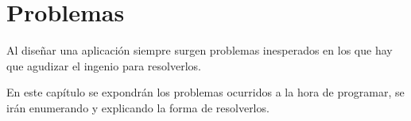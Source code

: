 %
%
%
%

\cleardoublepage
\chapter{Problemas}
\label{chap:troubles}

	Al diseñar una aplicación siempre surgen problemas inesperados en los que hay que agudizar el ingenio para resolverlos.

	En este capítulo se expondrán los problemas ocurridos a la hora de programar, se irán enumerando y explicando la forma de resolverlos.

